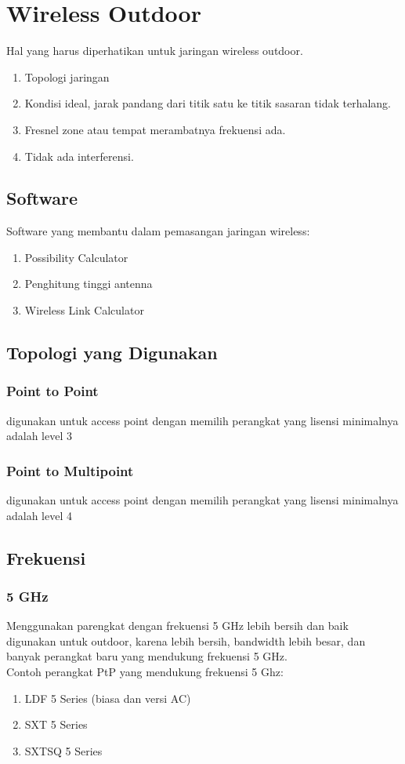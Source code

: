 \documentclass[a4paper,12pt]{article}
\begin{document}
\section{Wireless Outdoor}
Hal yang harus diperhatikan untuk jaringan wireless outdoor.
\begin{enumerate}
   \item Topologi jaringan
   \item Kondisi ideal, jarak pandang dari titik satu ke titik sasaran tidak terhalang.
   \item Fresnel zone atau tempat merambatnya frekuensi ada.
   \item Tidak ada interferensi.
\end{enumerate}

\subsection{Software}
Software yang membantu dalam pemasangan jaringan wireless:
\begin{enumerate}
    \item Possibility Calculator
    \item Penghitung tinggi antenna
    \item Wireless Link Calculator
\end{enumerate}

\subsection{Topologi yang Digunakan}
\subsubsection{Point to Point}
digunakan untuk access point dengan memilih
perangkat yang lisensi minimalnya adalah level 3

\subsubsection{Point to Multipoint}
digunakan untuk access point dengan memilih
perangkat yang lisensi minimalnya adalah level 4

\subsection{Frekuensi}
\subsubsection{5 GHz}
Menggunakan parengkat dengan frekuensi 5 GHz lebih bersih dan baik digunakan untuk outdoor, karena lebih bersih,
bandwidth lebih besar, dan banyak perangkat baru yang mendukung frekuensi 5 GHz.\\
Contoh perangkat PtP yang mendukung frekuensi 5 Ghz:
\begin{enumerate}
    \item LDF 5 Series (biasa dan versi AC)
    \item SXT 5 Series
    \item SXTSQ 5 Series
\end{enumerate}
\end{document}
